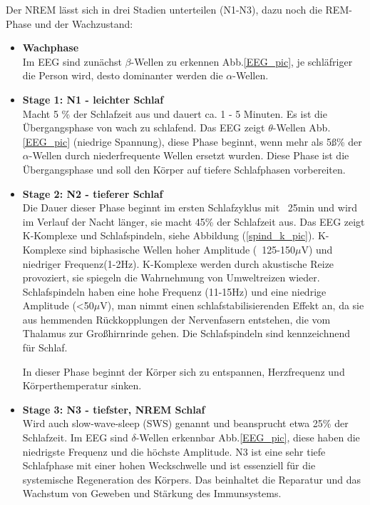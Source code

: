 \documentclass[a4paper, 12pt]{article}
\begin{document}
Der NREM lässt sich in drei Stadien unterteilen (N1-N3), dazu noch die REM-Phase und der Wachzustand:
\begin{itemize}

\item \textbf{Wachphase}\\
Im EEG sind zunächst \(\beta\)-Wellen zu erkennen Abb.\ref{EEG_pic}, je schläfriger die Person wird, desto dominanter werden die \(\alpha\)-Wellen.

\item \textbf{Stage 1: N1 - leichter Schlaf}\\
Macht 5 \% der Schlafzeit aus und dauert ca. 1 - 5 Minuten. Es ist die Übergangsphase von wach zu schlafend. Das EEG zeigt \(\theta \)-Wellen Abb.\ref{EEG_pic} (niedrige Spannung), diese Phase beginnt, wenn mehr als 5ß\% der \(\alpha\)-Wellen durch niederfrequente Wellen ersetzt wurden. Diese Phase ist die Übergangsphase und soll den Körper auf tiefere Schlafphasen vorbereiten.

\item \textbf{Stage 2: N2 - tieferer Schlaf}\\
Die Dauer dieser Phase beginnt im ersten Schlafzyklus mit ~25min und wird im Verlauf der Nacht länger, sie macht 45\% der Schlafzeit aus. Das EEG zeigt K-Komplexe und Schlafspindeln, siehe Abbildung (\ref{spind_k_pic}). K-Komplexe sind biphasische Wellen hoher Amplitude (~125-150\(\mu\)V) und niedriger Frequenz(1-2Hz). K-Komplexe werden durch akustische Reize provoziert, sie spiegeln die Wahrnehmung von Umweltreizen wieder. Schlafspindeln haben eine hohe Frequenz (11-15Hz) und eine niedrige Amplitude (<50\(\mu\)V), man nimmt einen schlafstabilisierenden Effekt an, da sie aus hemmenden Rückkopplungen der Nervenfasern entstehen, die vom Thalamus zur Großhirnrinde gehen. Die Schlafspindeln sind kennzeichnend für Schlaf. \cite{flexikon} \cite{pschyrembel_267}

In dieser Phase beginnt der Körper sich zu entspannen, Herzfrequenz und Körperthemperatur sinken.

\item \textbf{Stage 3: N3 - tiefster, NREM Schlaf}\\
Wird auch slow-wave-sleep (SWS) genannt und beansprucht etwa 25\% der Schlafzeit. Im EEG sind \(\delta\)-Wellen erkennbar Abb.\ref{EEG_pic}, diese haben die niedrigste Frequenz und die höchste Amplitude. N3 ist eine sehr tiefe Schlafphase mit einer hohen Weckschwelle und ist essenziell für die systemische Regeneration des Körpers. Das beinhaltet die Reparatur und das Wachstum von Geweben und Stärkung des Immunsystems.


\end{itemize}
\end{document}
